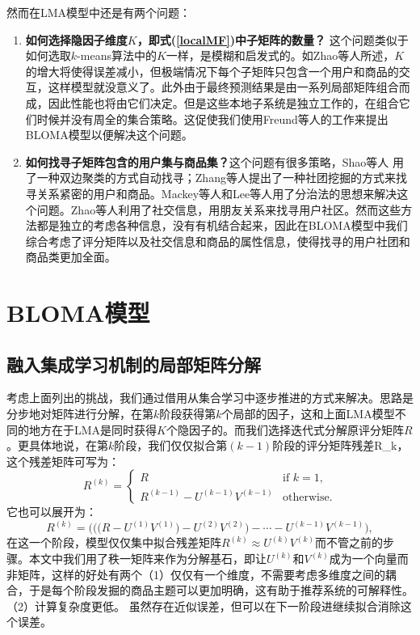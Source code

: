 然而在LMA模型中还是有两个问题：
\begin{enumerate}
\vspace{1.5mm}
\item \textbf{如何选择隐因子维度$K$，即式(\ref{localMF})中子矩阵的数量？} 这个问题类似于如何选取$k$-means算法中的$K$一样，是模糊和启发式的。如Zhao等人\cite{zhao2017collaborative}所述，$K$的增大将使得误差减小，但极端情况下每个子矩阵只包含一个用户和商品的交互，这样模型就没意义了。此外由于最终预测结果是由一系列局部矩阵组合而成，因此性能也将由它们决定。但是这些本地子系统是独立工作的，在组合它们时候并没有周全的集合策略。这促使我们使用Freund等人\cite{freund1999short}的工作来提出BLOMA模型以便解决这个问题。

\vspace{1.5mm}
\item \textbf{如何找寻子矩阵包含的用户集与商品集？}这个问题有很多策略，Shao等人 \cite{shao2017synchronization}用了一种双边聚类的方式自动找寻；Zhang等人\cite{zhang2013improve}提出了一种社团挖掘的方式来找寻关系紧密的用户和商品。Mackey等人\cite{mackey2011divide}和Lee\cite{lee2013local}等人用了分治法的思想来解决这个问题。Zhao等人\cite{zhao2017collaborative}利用了社交信息，用朋友关系来找寻用户社区。然而这些方法都是独立的考虑各种信息，没有有机结合起来，因此在BLOMA模型中我们综合考虑了评分矩阵以及社交信息和商品的属性信息，使得找寻的用户社团和商品类更加全面。
\end{enumerate}


\section{BLOMA模型}
\label{main}

\subsection{融入集成学习机制的局部矩阵分解}
考虑上面列出的挑战，我们通过借用从集合学习中逐步推进的方式来解决\cite{freund1999short}。思路是分步地对矩阵进行分解，在第$k$阶段获得第$k$个局部的因子，这和上面LMA模型不同的地方在于LMA是同时获得$K$个隐因子的。而我们选择迭代式分解原评分矩阵$R$。更具体地说，在第$k$阶段，我们仅仅拟合第$(k-1)$阶段的评分矩阵残差\gls{R_k}，这个残差矩阵可写为：
\begin{equation}
\label{residue}
R^{(k)} = 
\begin{cases}
R& \text{if } k=1,\\
R^{(k-1)}-U^{(k-1)}V^{(k-1)}& \text{otherwise}.
\end{cases}
\end{equation}
它也可以展开为：
\begin{equation}
\label{unfold}
R^{(k)} = \bigg(\Big(\big(R-U^{(1)}V^{(1)}\big) - U^{(2)}V^{(2)} \Big)-\cdots-U^{(k-1)}V^{(k-1)}\bigg),
\end{equation}
在这一个阶段，模型仅仅集中拟合残差矩阵$R^{(k)} \approx U^{(k)}V^{(k)}$而不管之前的步骤。本文中我们用了秩一矩阵来作为分解基石，即让$U^{(k)}$和$V^{(k)}$成为一个向量而非矩阵，这样的好处有两个（1）仅仅有一个维度，不需要考虑多维度之间的耦合，于是每个阶段发掘的商品主题可以更加明确，这有助于推荐系统的可解释性。
（2）计算复杂度更低。 虽然存在近似误差，但可以在下一阶段进继续拟合消除这个误差。

